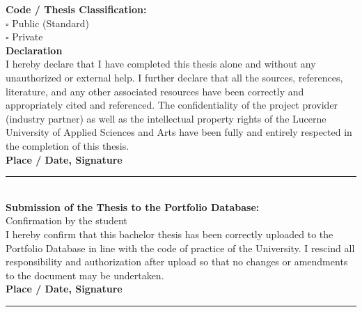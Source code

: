 \begin{titlepage}
\begin{flushleft}
        \vspace{1.0cm}
        \large \textbf{Code / Thesis Classification:} \\
        $\square$ Public (Standard) \\
        $\square$ Private \\
        \vspace{1.5cm}
        \textbf{Declaration} \\
        I hereby declare that I have completed this thesis alone and without any unauthorized or external help. I further declare that all the sources, references, literature, and any other associated resources have been correctly and appropriately cited and referenced. The confidentiality of the project provider (industry partner) as well as the intellectual property rights of the Lucerne University of Applied Sciences and Arts have been fully and entirely respected in the completion of this thesis. \\
        \vspace{0.5cm}
        \textbf{Place / Date, Signature} \quad \rule{10.5cm}{0.4pt} \\
        \vspace{1.5cm}
        \textbf{Submission of the Thesis to the Portfolio Database:} \\
        Confirmation by the student \\
        I hereby confirm that this bachelor thesis has been correctly uploaded to the Portfolio Database in line with the code of practice of the University. I rescind all responsibility and authorization after upload so that no changes or amendments to the document may be undertaken. \\
        \vspace{0.5cm}
        \textbf{Place / Date, Signature} \quad \rule{10.5cm}{0.4pt} 
    \end{flushleft}

    \clearpage
    \mbox{}
    \vfill
    \begin{flushleft}
    

\end{flushleft}
\end{titlepage}
